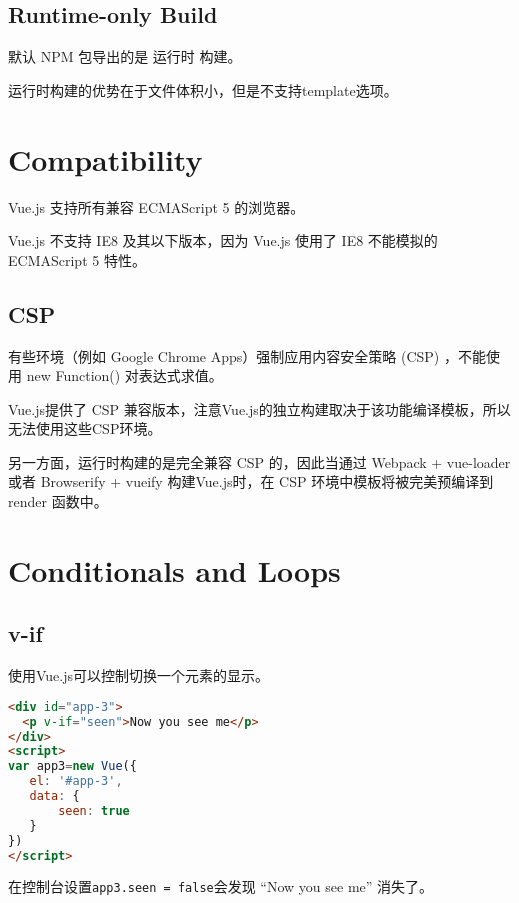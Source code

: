 \subsection{Runtime-only Build}


默认 NPM 包导出的是 运行时 构建。

运行时构建的优势在于文件体积小，但是不支持template选项。



\section{Compatibility}


 Vue.js 支持所有兼容 ECMAScript 5 的浏览器。
 
 Vue.js 不支持 IE8 及其以下版本，因为 Vue.js 使用了 IE8 不能模拟的 ECMAScript 5 特性。
 
 \subsection{CSP}
 
 
 有些环境（例如 Google Chrome Apps）强制应用内容安全策略 (CSP) ，不能使用 new Function() 对表达式求值。
 
Vue.js提供了 CSP 兼容版本，注意Vue.js的独立构建取决于该功能编译模板，所以无法使用这些CSP环境。

另一方面，运行时构建的是完全兼容 CSP 的，因此当通过 Webpack + vue-loader 或者 Browserify + vueify 构建Vue.js时，在 CSP 环境中模板将被完美预编译到 render 函数中。


 


\section{Conditionals and Loops}

\subsection{v-if}



使用Vue.js可以控制切换一个元素的显示。


\begin{lstlisting}[language=HTML]
<div id="app-3">
  <p v-if="seen">Now you see me</p>
</div>
<script>
var app3=new Vue({
   el: '#app-3',
   data: {
       seen: true
   }
})
</script>
\end{lstlisting}

在控制台设置\texttt{app3.seen = false}会发现 “Now you see me” 消失了。


